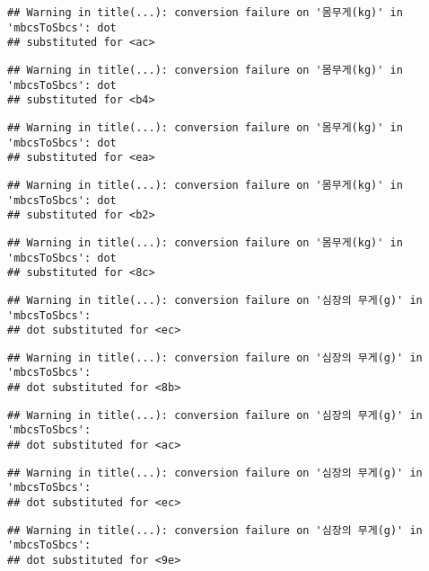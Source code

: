 \documentclass[
]{article}
\begin{document}
\begin{verbatim}
## Warning in title(...): conversion failure on '몸무게(kg)' in 'mbcsToSbcs': dot
## substituted for <ac>
\end{verbatim}

\begin{verbatim}
## Warning in title(...): conversion failure on '몸무게(kg)' in 'mbcsToSbcs': dot
## substituted for <b4>
\end{verbatim}

\begin{verbatim}
## Warning in title(...): conversion failure on '몸무게(kg)' in 'mbcsToSbcs': dot
## substituted for <ea>
\end{verbatim}

\begin{verbatim}
## Warning in title(...): conversion failure on '몸무게(kg)' in 'mbcsToSbcs': dot
## substituted for <b2>
\end{verbatim}

\begin{verbatim}
## Warning in title(...): conversion failure on '몸무게(kg)' in 'mbcsToSbcs': dot
## substituted for <8c>
\end{verbatim}

\begin{verbatim}
## Warning in title(...): conversion failure on '심장의 무게(g)' in 'mbcsToSbcs':
## dot substituted for <ec>
\end{verbatim}

\begin{verbatim}
## Warning in title(...): conversion failure on '심장의 무게(g)' in 'mbcsToSbcs':
## dot substituted for <8b>
\end{verbatim}

\begin{verbatim}
## Warning in title(...): conversion failure on '심장의 무게(g)' in 'mbcsToSbcs':
## dot substituted for <ac>
\end{verbatim}

\begin{verbatim}
## Warning in title(...): conversion failure on '심장의 무게(g)' in 'mbcsToSbcs':
## dot substituted for <ec>
\end{verbatim}

\begin{verbatim}
## Warning in title(...): conversion failure on '심장의 무게(g)' in 'mbcsToSbcs':
## dot substituted for <9e>
\end{verbatim}
\end{document}
